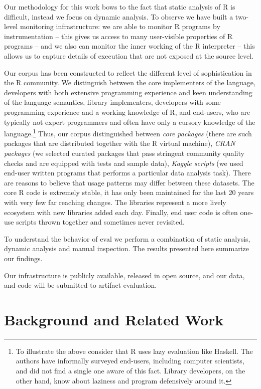 \documentclass[conference]{IEEEtran}
\begin{document}
Our methodology for this work bows to the fact that static analysis of R is
difficult, instead we focus on dynamic analysis. To observe \eval we have
built a two-level monitoring infrastructure: we are able to monitor R
programs by instrumentation -- this gives us access to many user-visible
properties of R programs -- and we also can monitor the inner working of the
R interpreter -- this allows us to capture details of execution that are not
exposed at the source level.

Our corpus has been constructed to reflect the different level of
sophistication in the R community. We distinguish between the core
implementers of the language, developers with both extensive programming
experience and keen understanding of the language semantics, library
implementers, developers with some programming experience and a working
knowledge of R, and end-users, who are typically not expert programmers and
often have only a cursory knowledge of the language.\footnote{To illustrate
  the above consider that R uses lazy evaluation like Haskell. The authors
  have informally surveyed end-users, including computer scientists, and did
  not find a single one aware of this fact. Library developers, on the other
  hand, know about laziness and program defensively around it.}  Thus, our
corpus distinguished between \emph{core packages} (there are \CorpusCorePackages such
packages that are distributed together with the R virtual machine), \emph{CRAN
  packages} (we selected \CorpusPackages curated packages that pass stringent
community quality checks and are equipped with tests and sample data),
\emph{Kaggle scripts} (we used \CorpusFinishedKaggle end-user written programs that performs a
particular data analysis task). There are reasons to believe that \eval
usage patterns may differ between these datasets. The core R code is
extremely stable, it has only been maintained for the last 20 years with
very few far reaching changes. The libraries represent a more lively
ecosystem with new libraries added each day.  Finally, end user code is
often one-use scripts thrown together and sometimes never revisited.


To understand the behavior of eval we perform a combination of static
analysis, dynamic analysis and manual inspection. The results presented
here summarize our findings.

Our infrastructure is publicly available, released in open source, and our
data, and code will be submitted to artifact evaluation.


\section{Background and Related Work}
\end{document}
